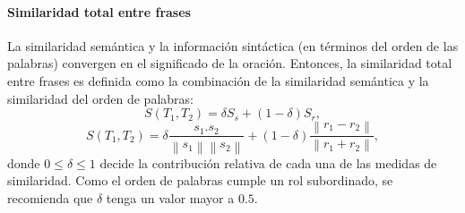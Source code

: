 \paragraph{Similaridad total entre frases}
La similaridad semántica y la información sintáctica (en términos del orden de las palabras) convergen en el significado de la oración. Entonces, la similaridad total entre frases es definida como la combinación de la similaridad semántica y la similaridad del orden de palabras:
\[S(T_1, T_2)=\delta S_s + (1 - \delta)S_r,\]
\[S(T_1, T_2)=\delta \frac{s_1.s_2}{\left \| s_1 \right \|\left \| s_2 \right \|} + (1 - \delta)\frac{\left \|r_1-r_2 \right \|}{\left \| r_1+r_2 \right \|},\]
donde \(0 \leq \delta \leq 1\) decide la contribución relativa de cada una de las medidas de similaridad. Como el orden de palabras cumple un rol subordinado, se recomienda que \(\delta\) tenga un valor mayor a \(0.5\).

